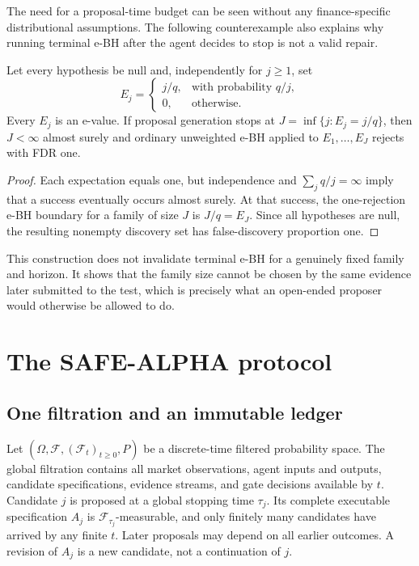 The need for a proposal-time budget can be seen without any finance-specific
distributional assumptions.  The following counterexample also explains why
running terminal e-BH after the agent decides to stop is not a valid repair.

\begin{proposition}
\label{prop:random-family}
Let every hypothesis be null and, independently for \(j\ge1\), set
\[
E_j=\begin{cases}j/q,&\text{with probability }q/j,\\0,&\text{otherwise}.
\end{cases}
\]
Every \(E_j\) is an e-value.  If proposal generation stops at
\(J=\inf\{j:E_j=j/q\}\), then \(J<\infty\) almost surely and ordinary
unweighted e-BH applied to \(E_1,\ldots,E_J\) rejects with FDR one.
\end{proposition}

\begin{proof}
Each expectation equals one, but independence and
\(\sum_jq/j=\infty\) imply that a success eventually occurs almost surely.
At that success, the one-rejection e-BH boundary for a family of size \(J\) is
\(J/q=E_J\).  Since all hypotheses are null, the resulting nonempty discovery
set has false-discovery proportion one.
\end{proof}

This construction does not invalidate terminal e-BH for a genuinely fixed
family and horizon.  It shows that the family size cannot be chosen by the
same evidence later submitted to the test, which is precisely what an
open-ended proposer would otherwise be allowed to do.

\section{The SAFE-ALPHA protocol}
\label{sec:method}

\subsection{One filtration and an immutable ledger}

Let
\((\Omega,\mathcal F,(\mathcal F_t)_{t\ge0},P)\) be a discrete-time filtered
probability space.  The global filtration contains all market observations,
agent inputs and outputs, candidate specifications, evidence streams, and
gate decisions available by \(t\).  Candidate \(j\) is proposed at a global
stopping time \(\tau_j\).  Its complete executable specification \(A_j\) is
\(\mathcal F_{\tau_j}\)-measurable, and only finitely many candidates have
arrived by any finite \(t\).  Later proposals may depend on all earlier
outcomes.  A revision of \(A_j\) is a new candidate, not a continuation of
\(j\).

